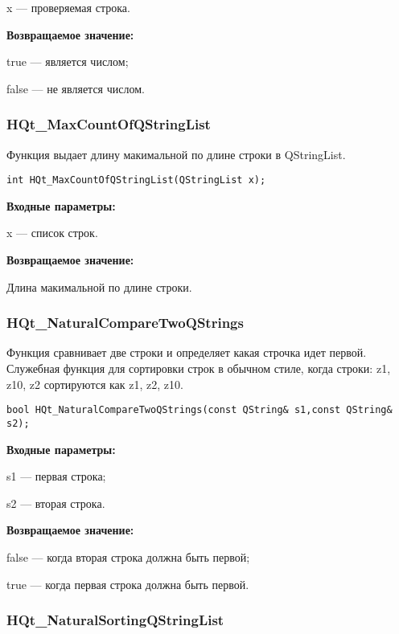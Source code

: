 \documentclass[a4paper,12pt]{article}
\begin{document}
x --- проверяемая строка.

\textbf{Возвращаемое значение:}
 
true --- является числом;

false --- не является числом.


\subsubsection{HQt\_MaxCountOfQStringList}\label{HQt_MaxCountOfQStringList}

Функция выдает длину макимальной по длине строки в QStringList.


\begin{lstlisting}[label=code_syntax_HQt_MaxCountOfQStringList,caption=Синтаксис]
int HQt_MaxCountOfQStringList(QStringList x);
\end{lstlisting}

\textbf{Входные параметры:}
 
x --- список строк.

\textbf{Возвращаемое значение:}

Длина макимальной по длине строки.


\subsubsection{HQt\_NaturalCompareTwoQStrings}\label{HQt_NaturalCompareTwoQStrings}

Функция сравнивает две строки и определяет какая строчка идет первой. Служебная функция для сортировки строк в обычном стиле, когда строки: z1, z10, z2 сортируются как z1, z2, z10.


\begin{lstlisting}[label=code_syntax_HQt_NaturalCompareTwoQStrings,caption=Синтаксис]
bool HQt_NaturalCompareTwoQStrings(const QString& s1,const QString& s2);
\end{lstlisting}

\textbf{Входные параметры:}

     s1 --- первая строка;
	 
     s2 --- вторая строка.

\textbf{Возвращаемое значение:}
 
false --- когда вторая строка должна быть первой;

true --- когда первая строка должна быть первой.


\subsubsection{HQt\_NaturalSortingQStringList}\label{HQt_NaturalSortingQStringList}
\end{document}
